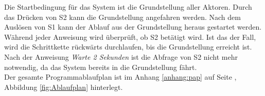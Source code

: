 Die Startbedingung für das System ist die Grundstellung aller Aktoren. Durch das Drücken von S2 kann die Grundstellung angefahren werden. Nach dem Auslösen von S1 kann der Ablauf aus der Grundstellung heraus gestartet werden. Während jeder Anweisung wird überprüft, ob S2 betätigt wird. Ist das der Fall, wird die Schrittkette rückwärts durchlaufen, bis die Grundstellung erreicht ist. Nach der Anweisung \textit{\glqq Warte 2 Sekunden\grqq{}} ist die Abfrage von S2 nicht mehr notwendig, da das System bereits in die Grundstellung fährt.\\
Der gesamte Programmablaufplan ist im Anhang \ref{anhang:pap} auf Seite \pageref{anhang:pap}, Abbildung \ref{fig:Ablaufplan} hinterlegt.
